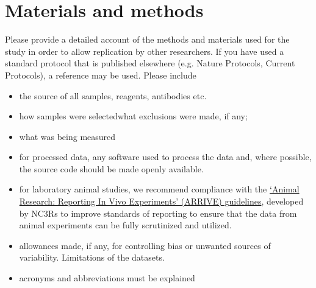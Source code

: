 \section*{Materials and methods} 
Please provide a detailed account of the methods and materials used for the study in order to allow replication by other researchers.
If you have used a standard protocol that is published elsewhere (e.g. Nature Protocols, Current Protocols), a reference may be used. Please include \begin{itemize}
\item 
the source of all samples, reagents, antibodies etc.
\item 
 how samples were selectedwhat exclusions were made, if any;
\item 
what was being measured
\item 
for processed data, any software used to process the data and, where possible, the source code should be made openly available.\item 

for laboratory animal studies, we recommend compliance with the \href{http://www.nc3rs.org.uk/downloaddoc.asp?id=1206&page=1357&skin=0}{`Animal Research: Reporting In Vivo Experiments' (ARRIVE) guidelines}, developed by NC3Rs to improve standards of reporting to ensure that the data from animal experiments can be fully scrutinized and utilized.\item 

allowances made, if any, for controlling bias or unwanted sources of variability.
Limitations of the datasets.\item 

acronyms and abbreviations must be explained
\end{itemize}